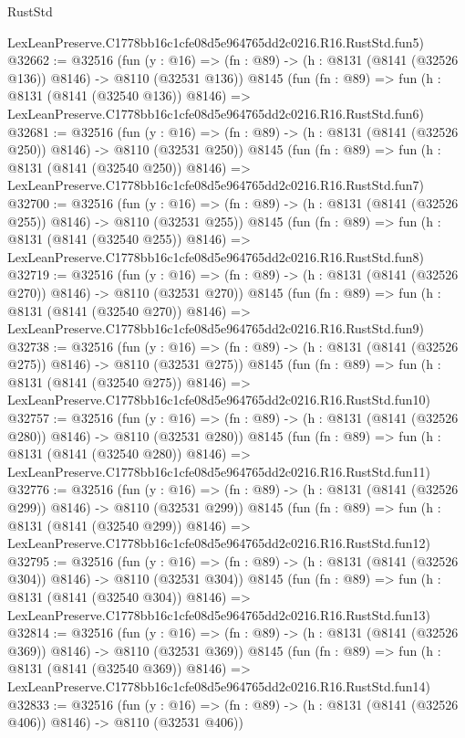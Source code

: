 \begin{lexlean}{RustStd}
\begin{coremodule}
    LexLeanPreserve.C1778bb16c1cfe08d5e964765dd2c0216.R16.RustStd.fun5)
@32662 := @32516
    (fun (y : @16) => (fn : @89) -> (h : @8131 (@8141 (@32526 @136)) @8146) -> @8110 (@32531 @136))
    @8145
    (fun (fn : @89) =>
    fun (h : @8131 (@8141 (@32540 @136)) @8146) =>
    LexLeanPreserve.C1778bb16c1cfe08d5e964765dd2c0216.R16.RustStd.fun6)
@32681 := @32516
    (fun (y : @16) => (fn : @89) -> (h : @8131 (@8141 (@32526 @250)) @8146) -> @8110 (@32531 @250))
    @8145
    (fun (fn : @89) =>
    fun (h : @8131 (@8141 (@32540 @250)) @8146) =>
    LexLeanPreserve.C1778bb16c1cfe08d5e964765dd2c0216.R16.RustStd.fun7)
@32700 := @32516
    (fun (y : @16) => (fn : @89) -> (h : @8131 (@8141 (@32526 @255)) @8146) -> @8110 (@32531 @255))
    @8145
    (fun (fn : @89) =>
    fun (h : @8131 (@8141 (@32540 @255)) @8146) =>
    LexLeanPreserve.C1778bb16c1cfe08d5e964765dd2c0216.R16.RustStd.fun8)
@32719 := @32516
    (fun (y : @16) => (fn : @89) -> (h : @8131 (@8141 (@32526 @270)) @8146) -> @8110 (@32531 @270))
    @8145
    (fun (fn : @89) =>
    fun (h : @8131 (@8141 (@32540 @270)) @8146) =>
    LexLeanPreserve.C1778bb16c1cfe08d5e964765dd2c0216.R16.RustStd.fun9)
@32738 := @32516
    (fun (y : @16) => (fn : @89) -> (h : @8131 (@8141 (@32526 @275)) @8146) -> @8110 (@32531 @275))
    @8145
    (fun (fn : @89) =>
    fun (h : @8131 (@8141 (@32540 @275)) @8146) =>
    LexLeanPreserve.C1778bb16c1cfe08d5e964765dd2c0216.R16.RustStd.fun10)
@32757 := @32516
    (fun (y : @16) => (fn : @89) -> (h : @8131 (@8141 (@32526 @280)) @8146) -> @8110 (@32531 @280))
    @8145
    (fun (fn : @89) =>
    fun (h : @8131 (@8141 (@32540 @280)) @8146) =>
    LexLeanPreserve.C1778bb16c1cfe08d5e964765dd2c0216.R16.RustStd.fun11)
@32776 := @32516
    (fun (y : @16) => (fn : @89) -> (h : @8131 (@8141 (@32526 @299)) @8146) -> @8110 (@32531 @299))
    @8145
    (fun (fn : @89) =>
    fun (h : @8131 (@8141 (@32540 @299)) @8146) =>
    LexLeanPreserve.C1778bb16c1cfe08d5e964765dd2c0216.R16.RustStd.fun12)
@32795 := @32516
    (fun (y : @16) => (fn : @89) -> (h : @8131 (@8141 (@32526 @304)) @8146) -> @8110 (@32531 @304))
    @8145
    (fun (fn : @89) =>
    fun (h : @8131 (@8141 (@32540 @304)) @8146) =>
    LexLeanPreserve.C1778bb16c1cfe08d5e964765dd2c0216.R16.RustStd.fun13)
@32814 := @32516
    (fun (y : @16) => (fn : @89) -> (h : @8131 (@8141 (@32526 @369)) @8146) -> @8110 (@32531 @369))
    @8145
    (fun (fn : @89) =>
    fun (h : @8131 (@8141 (@32540 @369)) @8146) =>
    LexLeanPreserve.C1778bb16c1cfe08d5e964765dd2c0216.R16.RustStd.fun14)
@32833 := @32516
    (fun (y : @16) => (fn : @89) -> (h : @8131 (@8141 (@32526 @406)) @8146) -> @8110 (@32531 @406))

\end{coremodule}
\end{lexlean}
